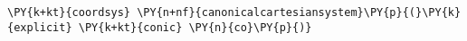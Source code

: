 \begin{Verbatim}[commandchars=\\\{\}]
    \PY{k+kt}{coordsys} \PY{n+nf}{canonicalcartesiansystem}\PY{p}{(}\PY{k}{explicit} \PY{k+kt}{conic} \PY{n}{co}\PY{p}{)}
\end{Verbatim}
